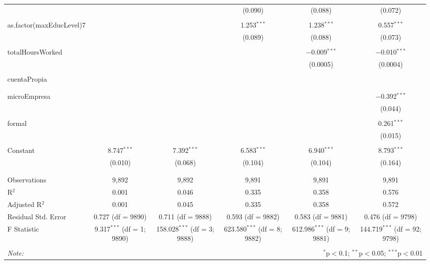\begin{table}[!htbp]
\begin{tabular}{@{\extracolsep{5pt}}lccccc}
  &  &  & (0.090) & (0.088) & (0.072) \\ 
  & & & & & \\ 
 as.factor(maxEducLevel)7 &  &  & 1.253$^{***}$ & 1.238$^{***}$ & 0.557$^{***}$ \\ 
  &  &  & (0.089) & (0.088) & (0.073) \\ 
  & & & & & \\ 
 totalHoursWorked &  &  &  & $-$0.009$^{***}$ & $-$0.010$^{***}$ \\ 
  &  &  &  & (0.0005) & (0.0004) \\ 
  & & & & & \\ 
 cuentaPropia &  &  &  &  &  \\ 
  &  &  &  &  &  \\ 
  & & & & & \\ 
 microEmpresa &  &  &  &  & $-$0.392$^{***}$ \\ 
  &  &  &  &  & (0.044) \\ 
  & & & & & \\ 
 formal &  &  &  &  & 0.261$^{***}$ \\ 
  &  &  &  &  & (0.015) \\ 
  & & & & & \\ 
 Constant & 8.747$^{***}$ & 7.392$^{***}$ & 6.583$^{***}$ & 6.940$^{***}$ & 8.793$^{***}$ \\ 
  & (0.010) & (0.068) & (0.104) & (0.104) & (0.164) \\ 
  & & & & & \\ 
\hline \\[-1.8ex] 
Observations & 9,892 & 9,892 & 9,891 & 9,891 & 9,891 \\ 
R$^{2}$ & 0.001 & 0.046 & 0.335 & 0.358 & 0.576 \\ 
Adjusted R$^{2}$ & 0.001 & 0.045 & 0.335 & 0.358 & 0.572 \\ 
Residual Std. Error & 0.727 (df = 9890) & 0.711 (df = 9888) & 0.593 (df = 9882) & 0.583 (df = 9881) & 0.476 (df = 9798) \\ 
F Statistic & 9.317$^{***}$ (df = 1; 9890) & 158.028$^{***}$ (df = 3; 9888) & 623.580$^{***}$ (df = 8; 9882) & 612.986$^{***}$ (df = 9; 9881) & 144.719$^{***}$ (df = 92; 9798) \\ 
\hline 
\hline \\[-1.8ex] 
\textit{Note:}  & \multicolumn{5}{r}{$^{*}$p$<$0.1; $^{**}$p$<$0.05; $^{***}$p$<$0.01} \\ 
\end{tabular} 
\end{table} 
